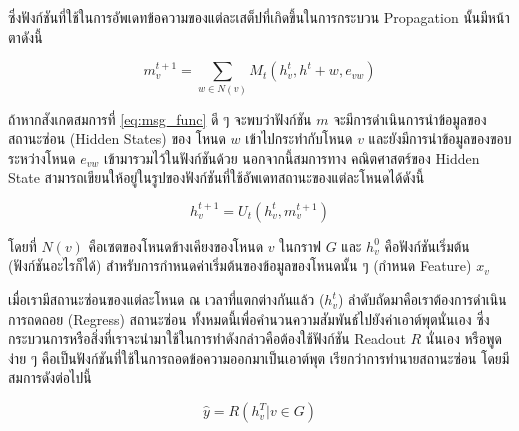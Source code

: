 \noindent ซึ่งฟังก์ชันที่ใช้ในการอัพเดทข้อความของแต่ละเสต็ปที่เกิดขึ้นในการกระบวน Propagation นั้นมีหน้าตาดังนี้

\begin{equation}\label{eq:msg_func}
    m^{t+1}_{v} = \sum_{w \in N(v)} M_{t} (h^{t}_{v}, h^{t}+{w}, e_{vw})
\end{equation}

ถ้าหากสังเกตสมการที่ \ref{eq:msg_func} ดี ๆ จะพบว่าฟังก์ชัน $m$ จะมีการดำเนินการนำข้อมูลของสถานะซ่อน (Hidden States) ของ%
โหนด $w$ เข้าไปกระทำกับโหนด $v$ และยังมีการนำข้อมูลของขอบระหว่างโหนด $e_{vw}$ เข้ามารวมไว้ในฟังก์ชันด้วย นอกจากนี้สมการทาง%
คณิตศาสตร์ของ Hidden State สามารถเขียนให้อยู่ในรูปของฟังก์ชันที่ใช้อัพเดทสถานะของแต่ละโหนดได้ดังนี้ 

\begin{equation}\label{hidden_func}
    h^{t+1}_{v} = U_{t}(h^{t}_{v}, m^{t+1}_{v})
\end{equation}

\noindent โดยที่ $N(v)$ คือเซตของโหนดข้างเคียงของโหนด $v$ ในกราฟ $G$ และ $h^{0}_{v}$ คือฟังก์ชันเริ่มต้น (ฟังก์ชันอะไรก็ได้) 
สำหรับการกำหนดค่าเริ่มต้นของข้อมูลของโหนดนั้น ๆ (กำหนด Feature) $x_{v}$

\begin{center}
\end{center}

เมื่อเรามีสถานะซ่อนของแต่ละโหนด ณ เวลาที่แตกต่างกันแล้ว ($h^{t}_{v}$) ลำดับถัดมาคือเราต้องการดำเนินการถดถอย (Regress) สถานะซ่อน%
ทั้งหมดนี้เพื่อคำนวนความสัมพันธ์ไปยังค่าเอาต์พุตนั่นเอง ซึ่งกระบวนการหรือสิ่งที่เราจะนำมาใช้ในการทำดังกล่าวคือต้องใช้ฟังก์ชัน Readout $R$ นั่นเอง
หรือพูดง่าย ๆ คือเป็นฟังก์ชันที่ใช้ในการถอดข้อความออกมาเป็นเอาต์พุต เรียกว่าการทำนายสถานะซ่อน โดยมีสมการดังต่อไปนี้

\begin{equation}
    \hat{y} = R({h^{T}_{v} | v \in G})
\end{equation}

